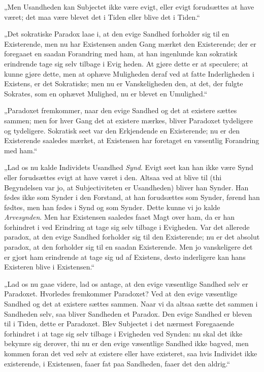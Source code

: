 „Men Usandheden kan Subjectet ikke være evigt, eller evigt
forudsættes at have været; det maa være blevet det i Tiden eller
blive det i Tiden.“

„Det sokratiske Paradox laae i, at den evige Sandhed forholder sig
til en Existerende, men nu har Existensen anden Gang mærket den
Existerende; der er foregaaet en saadan Forandring med ham, at han
ingenlunde kan sokratisk erindrende tage sig selv tilbage i Evig%
heden. At gjøre dette er at speculere; at kunne gjøre dette, men
at ophæve Muligheden deraf ved at fatte Inderligheden i Existens,
er det Sokratiske; men nu er Vanskeligheden den, at det, der
fulgte Sokrates, som en ophævet Mulighed, nu er blevet en
Umulighed.“

„Paradoxet fremkommer, naar den evige Sandhed og det at existere
sættes sammen; men for hver Gang det at existere mærkes, bliver
Paradoxet tydeligere og tydeligere. Sokratisk seet var den
Erkjendende en Existerende; nu er den Existerende saaledes mærket,
at Existensen har foretaget en væsentlig Forandring med ham.“

„Lad os nu kalde Individets Usandhed \emph{Synd}. Evigt seet kan
han ikke være Synd eller forudsættes evigt at have været i den.
Altsaa ved at blive til (thi Begyndelsen var jo, at
Subjectiviteten er Usandheden) bliver han Synder. Han fødes ikke
som Synder i den Forstand, at han forudsættes som Synder, førend
han fødtes, men han fødes i Synd og som Synder. Dette kunne vi jo
kalde \emph{Arvesynden}. Men har Existensen saaledes faaet Magt
over ham, da er han forhindret i ved Erindring at tage sig selv
tilbage i Evigheden. Var det allerede paradox, at den evige
Sandhed forholder sig til den Existerende; nu er det absolut
paradox, at den forholder sig til en saadan Existerende. Men jo
vanskeligere det er gjort ham erindrende at tage sig ud af
Existens, desto inderligere kan hans Existeren blive i
Existensen.“

„Lad os nu gaae videre, lad os antage, at den
 evige væsentlige Sandhed selv er Paradoxet. Hvorledes fremkommer
Paradoxet? Ved at den evige væsentlige Sandhed og det at existere
sættes sammen. Naar vi da altsaa sætte det sammen i Sandheden
selv, saa bliver Sandheden et Paradox. Den evige Sandhed er bleven
til i Tiden, dette er Paradoxet. Blev Subjectet i det nærmest
Foregaaende forhindret i at tage sig selv tilbage i Evigheden ved
Synden: nu skal det ikke bekymre sig derover, thi nu er den evige
væsentlige Sandhed ikke bagved, men kommen foran det ved selv at
existere eller have existeret, saa hvis Individet ikke
existerende, i Existensen, faaer fat paa Sandheden, faaer det den
aldrig.“

